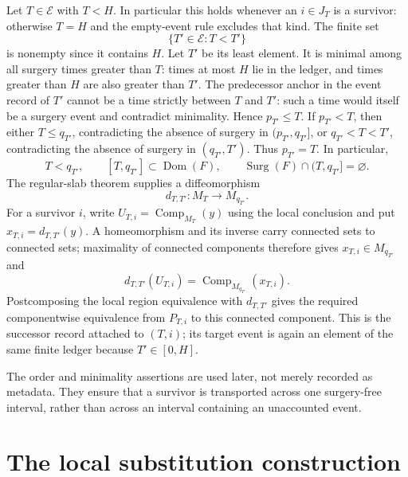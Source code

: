 Let $T\in\mathcal E$ with $T<H$.  In particular this holds whenever an
$i\in J_T$ is a survivor: otherwise $T=H$ and the empty-event rule excludes
that kind.  The finite set
\[
  \{T'\in\mathcal E:T<T'\}
\]
is nonempty since it contains $H$.  Let $T'$ be its least element.  It is
minimal among all surgery times greater than $T$: times at most $H$ lie in
the ledger, and times greater than $H$ are also greater than $T'$.  The predecessor anchor in the
event record of $T'$ cannot be a time strictly between $T$ and $T'$: such a
time would itself be a surgery event and contradict minimality.  Hence
$p_{T'}\leq T$.  If $p_{T'}<T$, then either $T\leq q_{T'}$, contradicting
the absence of surgery in $(p_{T'},q_{T'}]$, or $q_{T'}<T<T'$, contradicting
the absence of surgery in $(q_{T'},T')$.  Thus $p_{T'}=T$.  In particular,
\begin{equation}
  T<q_{T'},\qquad [T,q_{T'}]\subset\operatorname{Dom}(F),
  \qquad \operatorname{Surg}(F)\cap(T,q_{T'}]=\varnothing.
  \label{eq:successor-slab}
\end{equation}
The regular-slab theorem supplies a diffeomorphism
\begin{equation}
  d_{T,T'}:M_T\longrightarrow M_{q_{T'}}.
  \label{eq:successor-diffeo}
\end{equation}
For a survivor $i$, write $U_{T,i}=\operatorname{Comp}_{M_T}(y)$ using the
local conclusion and put $x_{T,i}=d_{T,T'}(y)$.  A homeomorphism and its inverse
carry connected sets to connected sets; maximality of connected components
therefore gives
$x_{T,i}\in M_{q_{T'}}$ and
\begin{equation}
  d_{T,T'}(U_{T,i})=\operatorname{Comp}_{M_{q_{T'}}}(x_{T,i}).
  \label{eq:successor-component}
\end{equation}
Postcomposing the local region equivalence with $d_{T,T'}$ gives the required
componentwise equivalence from $P_{T,i}$ to this connected component.  This is
the successor record attached to $(T,i)$; its target event is again an element
of the same finite ledger because $T'\in[0,H]$.

The order and minimality assertions are used later, not merely recorded as
metadata.  They ensure that a survivor is transported across one surgery-free
interval, rather than across an interval containing an unaccounted event.

\section{The local substitution construction}
\label{sec:finite-substitution}

